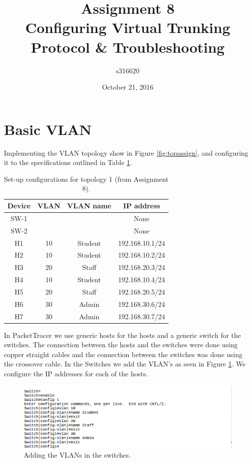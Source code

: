 \documentclass{article}
\date{October 21, 2016}
\title{\textbf{Assignment 8}\\Configuring Virtual Trunking Protocol & Troubleshooting}
\author{s316620}
\begin{document}
\maketitle
\newpage

\section{Basic VLAN} 
Implementing the VLAN topology show in Figure \ref{fig:topassign}, and configuring it to the specifications outlined in Table \ref{tab:topology1-config}. 
\begin{table}[h]
    \centering
    \begin{tabular}{|c|c|c|c|}
    \hline
    Device & VLAN & VLAN name & IP address \\
    \hline
    SW-1& & & None \\
         SW-2& & & None \\
         H1 & 10 & Student & 192.168.10.1/24\\
         H2 & 10 & Student & 192.168.10.2/24\\
         H3 & 20 & Staff & 192.168.20.3/24\\
         H4 & 10 & Student & 192.168.10.4/24\\
         H5 & 20 & Staff & 192.168.20.5/24 \\
         H6 & 30 & Admin & 192.168.30.6/24 \\
         H7 & 30 & Admin & 192.168.30.7/24 \\
         \hline
    \end{tabular}
    \caption{Set-up configurations for topology 1 (from Assignment 8). }
    \label{tab:topology1-config}
\end{table}

In PacketTracer we use generic hosts for the hosts and a generic switch for the switches. The connection between the hosts and the switches were done using copper straight cables and the connection between the switches was done using the crossover cable. In the Switches we add the VLAN's as seen in Figure \ref{fig:1vlanconf}. 
We configure the IP addresses for each of the hosts.
\begin{figure}[h]
    \centering
    \includegraphics[scale=0.6]{1vlanconf}
    \caption{Adding the VLANs in the switches.}
    \label{fig:1vlanconf}
\end{figure}
\end{document}
